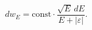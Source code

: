 \par\begin{equation}
 dw_E=\mathrm{const}\cdot\frac{\sqrt E\,dE}{E+|\varepsilon|}.
 \tag{146.4}
\end{equation}
